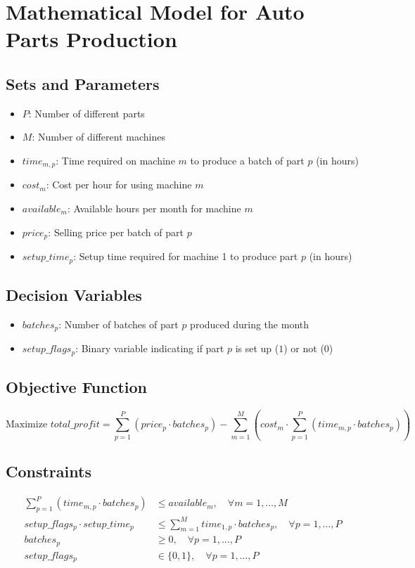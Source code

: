 \documentclass{article}
\begin{document}
\section*{Mathematical Model for Auto Parts Production}

\subsection*{Sets and Parameters}
\begin{itemize}
    \item \( P \): Number of different parts
    \item \( M \): Number of different machines
    \item \( time_{m,p} \): Time required on machine \( m \) to produce a batch of part \( p \) (in hours)
    \item \( cost_{m} \): Cost per hour for using machine \( m \)
    \item \( available_{m} \): Available hours per month for machine \( m \)
    \item \( price_{p} \): Selling price per batch of part \( p \)
    \item \( setup\_time_{p} \): Setup time required for machine 1 to produce part \( p \) (in hours)
\end{itemize}

\subsection*{Decision Variables}
\begin{itemize}
    \item \( batches_{p} \): Number of batches of part \( p \) produced during the month
    \item \( setup\_flags_{p} \): Binary variable indicating if part \( p \) is set up (\( 1 \)) or not (\( 0 \))
\end{itemize}

\subsection*{Objective Function}
\[
\text{Maximize } total\_profit = \sum_{p=1}^{P} (price_{p} \cdot batches_{p}) - \sum_{m=1}^{M} \left( cost_{m} \cdot \sum_{p=1}^{P} (time_{m,p} \cdot batches_{p}) \right)
\]

\subsection*{Constraints}
\begin{align*}
\sum_{p=1}^{P} (time_{m,p} \cdot batches_{p}) & \leq available_{m}, \quad \forall m = 1, \ldots, M \\
setup\_flags_{p} \cdot setup\_time_{p} & \leq \sum_{m=1}^{M} time_{1,p} \cdot batches_{p}, \quad \forall p = 1, \ldots, P \\
batches_{p} & \geq 0, \quad \forall p = 1, \ldots, P \\
setup\_flags_{p} & \in \{0, 1\}, \quad \forall p = 1, \ldots, P 
\end{align*}
\end{document}
